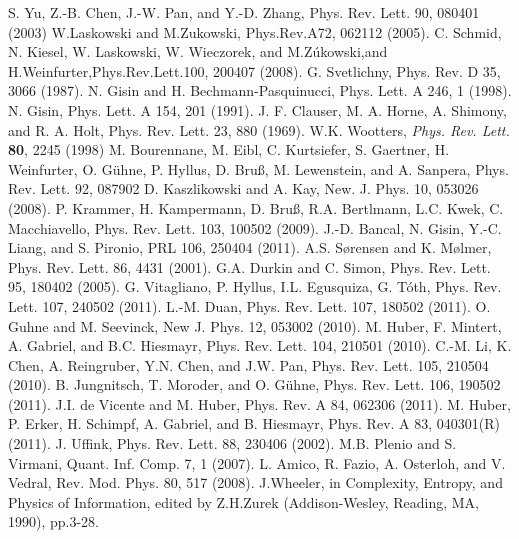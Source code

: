 \begin{thebibliography}{}
  S. Yu, Z.-B. Chen, J.-W. Pan, and Y.-D. Zhang, Phys. Rev. Lett. 90, 080401 (2003)
  W.Laskowski and M.Zukowski, Phys.Rev.A72, 062112 (2005).
  C. Schmid, N. Kiesel, W. Laskowski, W. Wieczorek, and M.Z\'ukowski,and H.Weinfurter,Phys.Rev.Lett.100, 200407 (2008).
  G. Svetlichny, Phys. Rev. D 35, 3066 (1987).
  N. Gisin and H. Bechmann-Pasquinucci, Phys. Lett. A 246, 1 (1998).
  N. Gisin, Phys. Lett. A 154, 201 (1991).
  J. F. Clauser, M. A. Horne, A. Shimony, and R. A. Holt, Phys. Rev. Lett. 23, 880 (1969).
  W.K. Wootters, \textit{Phys. Rev. Lett.} \textbf{80}, 2245 (1998)
  M. Bourennane, M. Eibl, C. Kurtsiefer, S. Gaertner, H. Weinfurter, O. G\"uhne, P. Hyllus, D. Bruß, M. Lewenstein, and A. Sanpera, Phys. Rev. Lett. 92, 087902
  D. Kaszlikowski and A. Kay, New. J. Phys. 10, 053026 (2008).
  P. Krammer, H. Kampermann, D. Bruß, R.A. Bertlmann, L.C. Kwek, C. Macchiavello, Phys. Rev. Lett. 103, 100502 (2009).
  J.-D. Bancal, N. Gisin, Y.-C. Liang, and S. Pironio, PRL 106, 250404 (2011).
  A.S. Sørensen and K. Mølmer, Phys. Rev. Lett. 86, 4431 (2001).
  G.A. Durkin and C. Simon, Phys. Rev. Lett. 95, 180402 (2005).
  G. Vitagliano, P. Hyllus, I.L. Egusquiza, G. T\'oth, Phys. Rev. Lett. 107, 240502 (2011).
  L.-M. Duan, Phys. Rev. Lett. 107, 180502 (2011).
  O. Guhne and M. Seevinck, New J. Phys. 12, 053002 (2010).
  M. Huber, F. Mintert, A. Gabriel, and B.C. Hiesmayr, Phys. Rev. Lett. 104, 210501 (2010).
  C.-M. Li, K. Chen, A. Reingruber, Y.N. Chen, and J.W. Pan, Phys. Rev. Lett. 105, 210504 (2010).
  B. Jungnitsch, T. Moroder, and O. G\"uhne, Phys. Rev. Lett. 106, 190502 (2011).
  J.I. de Vicente and M. Huber, Phys. Rev. A 84, 062306 (2011).
  M. Huber, P. Erker, H. Schimpf, A. Gabriel, and B. Hiesmayr, Phys. Rev. A 83, 040301(R) (2011).
  J. Uffink, Phys. Rev. Lett. 88, 230406 (2002).
  M.B. Plenio and S. Virmani, Quant. Inf. Comp. 7, 1 (2007).
  L. Amico, R. Fazio, A. Osterloh, and V. Vedral, Rev. Mod. Phys. 80, 517 (2008).
  J.Wheeler, in Complexity, Entropy, and Physics of Information, edited by Z.H.Zurek (Addison-Wesley, Reading, MA, 1990), pp.3-28.

\end{thebibliography}
